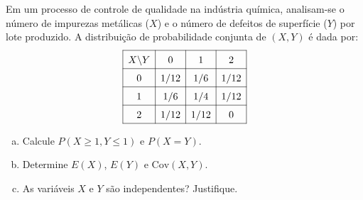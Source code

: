 %
%


\begin{exercicioBanco}[\valorquestao]
\noindent
Em um processo de controle de qualidade na indústria química, analisam-se o número de impurezas metálicas ($X$) e o número de defeitos de superfície ($Y$) por lote produzido. A distribuição de probabilidade conjunta de $(X,Y)$ é dada por:
\[
\renewcommand{\arraystretch}{1.5}
\begin{array}{|c|c|c|c|}
\hline
X \backslash Y & 0 & 1 & 2 \\ \hline
0 & 1/12 & 1/6 & 1/12 \\ \hline
1 & 1/6 & 1/4 & 1/12 \\ \hline
2 & 1/12 & 1/12 & 0 \\ \hline
\end{array}
\]

\begin{enumerate}[(a)]
    \item Calcule $P(X \ge 1, Y \le 1)$ e $P(X = Y)$.
    \item Determine $E(X)$, $E(Y)$ e $\text{Cov}(X,Y)$.
    \item As variáveis $X$ e $Y$ são independentes? Justifique.
\end{enumerate}
\end{exercicioBanco}


